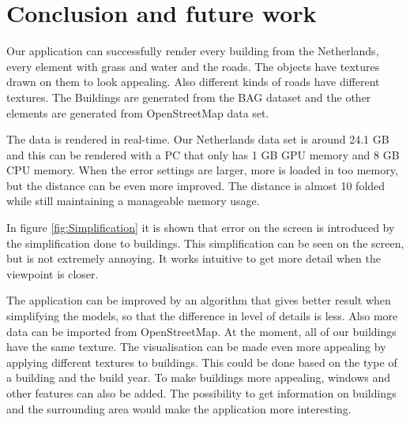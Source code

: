 \chapter{Conclusion and future work}
\label{chap:ConclusionAndFutureWork}
Our application can successfully render every building from the Netherlands, every element with grass and water and the roads. The objects have textures drawn on them to look appealing. Also different kinds of roads have different textures. The Buildings are generated from the BAG dataset and the other elements are generated from OpenStreetMap data set.

The data is rendered in real-time. Our Netherlands data set is around 24.1 GB and this can be rendered with a PC that only has 1 GB GPU memory and 8 GB CPU memory. When the error settings are larger, more is loaded in too memory, but the distance can be even more improved. The distance is almost 10 folded while still maintaining a manageable memory usage.

In figure \ref{fig:Simplification} it is shown that error on the screen is introduced by the simplification done to buildings. This simplification can be seen on the screen, but is not extremely annoying. It works intuitive to get more detail when the viewpoint is closer.

The application can be improved by an algorithm that gives better result when simplifying the models, so that the difference in level of details is less. Also more data can be imported from OpenStreetMap. At the moment, all of our buildings have the same texture. The visualisation can be made even more appealing by applying different textures to buildings. This could be done based on the type of a building and the build year. To make buildings more appealing, windows and other features can also be added. The possibility to get information on buildings and the surrounding area would make the application more interesting.
